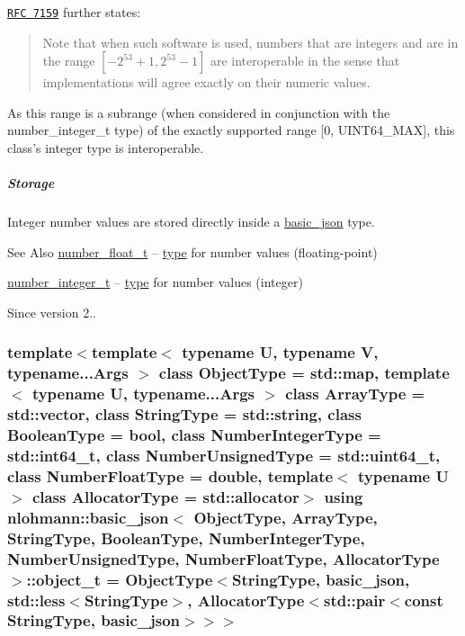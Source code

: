 \href{http://rfc7159.net/rfc7159}{\tt R\-F\-C 7159} further states\-: \begin{quotation}
Note that when such software is used, numbers that are integers and are in the range $[-2^{53}+1, 2^{53}-1]$ are interoperable in the sense that implementations will agree exactly on their numeric values.

\end{quotation}


As this range is a subrange (when considered in conjunction with the number\-\_\-integer\-\_\-t type) of the exactly supported range \mbox{[}0, U\-I\-N\-T64\-\_\-\-M\-A\-X\mbox{]}, this class's integer type is interoperable.

\subparagraph*{Storage}

Integer number values are stored directly inside a \hyperlink{classnlohmann_1_1basic__json}{basic\-\_\-json} type.

\begin{DoxySeeAlso}{See Also}
\hyperlink{classnlohmann_1_1basic__json_a74a0013e847fdc574b48f931f0e757e1}{number\-\_\-float\-\_\-t} -- \hyperlink{classnlohmann_1_1basic__json_a5d466b240d0ba9f648d7fd4ff42359f5}{type} for number values (floating-\/point)

\hyperlink{classnlohmann_1_1basic__json_ac4b10b2364f26ce47bdb9a413ff04a59}{number\-\_\-integer\-\_\-t} -- \hyperlink{classnlohmann_1_1basic__json_a5d466b240d0ba9f648d7fd4ff42359f5}{type} for number values (integer)
\end{DoxySeeAlso}
\begin{DoxySince}{Since}
version 2.. 
\end{DoxySince}
\hypertarget{classnlohmann_1_1basic__json_a0ac9894c9de8dc551cf2e5f1c605537f}{
\subsubsection[{object\-\_\-t}]{\setlength{\rightskip}{0pt plus 5cm}template$<$template$<$ typename U, typename V, typename...\-Args $>$ class Object\-Type = std\-::map, template$<$ typename U, typename...\-Args $>$ class Array\-Type = std\-::vector, class String\-Type  = std\-::string, class Boolean\-Type  = bool, class Number\-Integer\-Type  = std\-::int64\-\_\-t, class Number\-Unsigned\-Type  = std\-::uint64\-\_\-t, class Number\-Float\-Type  = double, template$<$ typename U $>$ class Allocator\-Type = std\-::allocator$>$ using {\bf nlohmann\-::basic\-\_\-json}$<$ Object\-Type, Array\-Type, String\-Type, Boolean\-Type, Number\-Integer\-Type, Number\-Unsigned\-Type, Number\-Float\-Type, Allocator\-Type $>$\-::{\bf object\-\_\-t} =  Object\-Type$<$String\-Type, {\bf basic\-\_\-json}, std\-::less$<$String\-Type$>$, Allocator\-Type$<$std\-::pair$<$const String\-Type, {\bf basic\-\_\-json}$>$$>$$>$}}\label{classnlohmann_1_1basic__json_a0ac9894c9de8dc551cf2e5f1c605537f}


